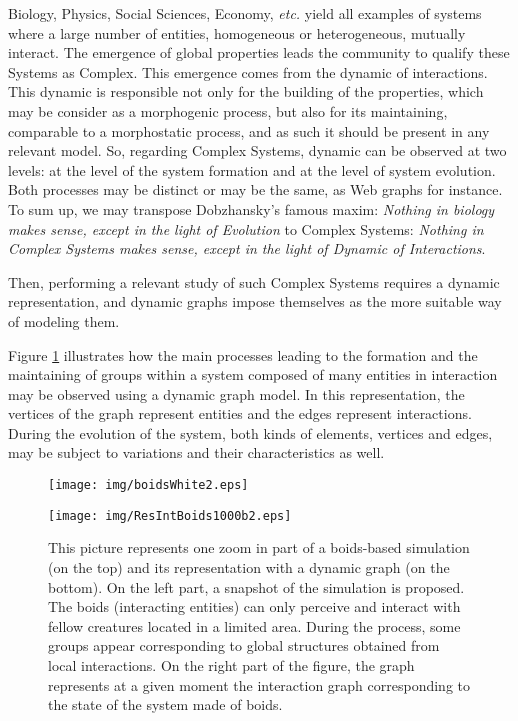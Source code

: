 \documentclass{svmult}
\begin{document}
Biology, Physics, Social Sciences, Economy, \textit{etc.} yield all examples
of systems where a large number of entities, homogeneous or heterogeneous,
mutually interact.  
The emergence of global properties leads the community to qualify these
Systems as Complex.
This emergence comes from the dynamic of interactions.
This dynamic is responsible not only for the building of the properties,
which may be consider as a morphogenic process, but also for its maintaining,
comparable to a morphostatic process, and as such it should be present in any
relevant model.   
So, regarding Complex Systems, dynamic can be observed at two levels: at the
level of the system formation and at the level of system evolution. 
Both processes may be distinct or may be the same, as Web graphs for
instance. 
To sum up, we may transpose Dobzhansky's famous maxim: 
{\em Nothing in biology makes sense, except in the light of Evolution} to Complex Systems: 
{\em Nothing in Complex Systems makes sense, except in the light of Dynamic of Interactions}.

Then, performing a relevant study of such Complex Systems requires
a dynamic representation, and dynamic graphs impose themselves as the more
suitable way of modeling them. 

Figure \ref{fig:boids} illustrates how the main processes leading to the
formation and the maintaining of groups within a system composed of many
entities in interaction may be observed using a dynamic graph model.
In this representation, the vertices of the graph represent entities and the
edges represent interactions.  
During the evolution of the system, both kinds of elements, vertices and
edges, may be subject to variations and their characteristics as well. 

\begin{figure}[h]
        \centering
                \texttt{[image: img/boidsWhite2.eps]}
                
                \texttt{[image: img/ResIntBoids1000b2.eps]}
        \caption{This picture represents one zoom in part of a boids-based simulation (on the
                top) and its representation with a dynamic graph (on the
                bottom). 
                On the left part, a snapshot of the simulation is proposed. 
                The boids (interacting entities) can only perceive and
                interact with fellow creatures located in a limited area.
                During the process, some groups appear corresponding to global
                structures obtained from local interactions.
                On the right part of the figure, the graph represents at a
                given moment the interaction graph corresponding to the
                state of the system made of boids.}
        \label{fig:boids}
\end{figure}
\FloatBarrier
\end{document}
